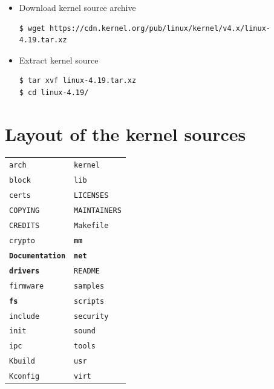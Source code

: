 \documentclass{beamer}
\begin{document}
\begin{frame}[fragile]
  \begin{itemize}
  \item Download kernel source archive
    \begin{lstlisting}
$ wget https://cdn.kernel.org/pub/linux/kernel/v4.x/linux-4.19.tar.xz
    \end{lstlisting}

  \item Extract kernel source
    \begin{lstlisting}
$ tar xvf linux-4.19.tar.xz 
$ cd linux-4.19/
    \end{lstlisting}
  \end{itemize}
\end{frame}

\section{Layout of the kernel sources}
\label{sec:layout-kernel-source}

\begin{frame}[fragile]
  \begin{tabular}{ll}
    \texttt{arch} & \texttt{kernel} \\
    \texttt{block} & \texttt{lib} \\
    \texttt{certs} & \texttt{LICENSES} \\
    \texttt{COPYING} & \texttt{MAINTAINERS} \\
    \texttt{CREDITS} & \texttt{Makefile} \\
    \texttt{crypto} & \textbf{\texttt{mm}} \\
    \textbf{\texttt{Documentation}} & \textbf{\texttt{net}} \\
    \textbf{\texttt{drivers}} & \texttt{README} \\
    \texttt{firmware} & \texttt{samples} \\
    \textbf{\texttt{fs}} & \texttt{scripts} \\
    \texttt{include} & \texttt{security} \\
    \texttt{init} & \texttt{sound} \\
    \texttt{ipc} & \texttt{tools} \\
    \texttt{Kbuild} & \texttt{usr} \\
    \texttt{Kconfig} & \texttt{virt} \\
  \end{tabular}
\end{frame}
\end{document}

